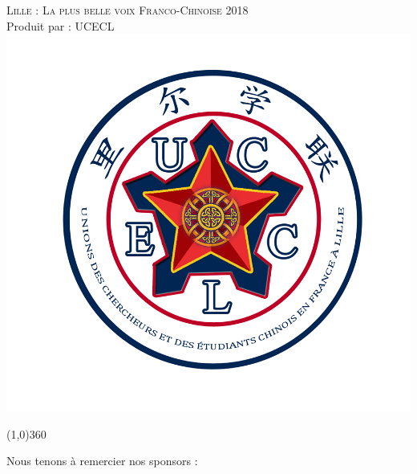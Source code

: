 \documentclass[11pt,fleqn]{book} %
\newcommand{\misoline}{
\vspace{-1.5em}
\begin{center}
\line(1,0){360}
\end{center}
}
\begin{document}
\newpage
\thispagestyle{empty}
\begin{center}
\huge{\textsc{Lille : La plus belle voix Franco-Chinoise 2018}}\\
\LARGE{Produit par : UCECL}\\ 
\includegraphics[scale=0.1]{img/avatar.png}%
\vspace{1cm}
\misoline
\huge{Nous tenons à remercier nos sponsors :}\\ 


\end{center}
\end{document}
